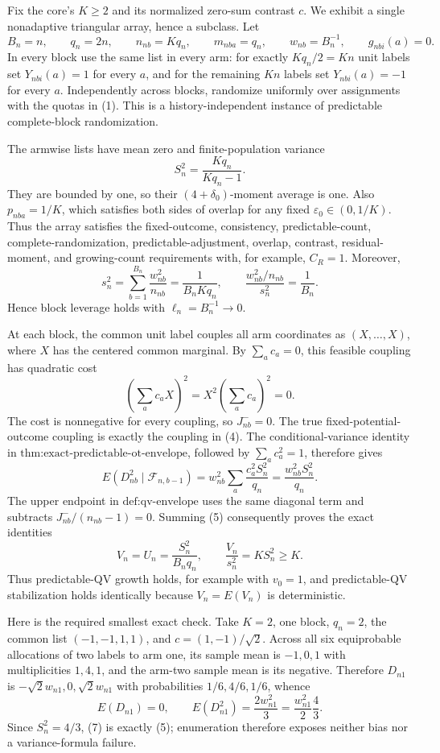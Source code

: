 Fix the core's \(K\ge2\) and its normalized zero-sum contrast \(c\).  We exhibit a single nonadaptive triangular array, hence a subclass.  Let
\[
B_n=n,\qquad q_n=2n,\qquad n_{nb}=Kq_n,\qquad
m_{nba}=q_n,\qquad w_{nb}=B_n^{-1},\qquad g_{nbi}(a)=0.
\tag{1}
\]
In every block use the same list in every arm: for exactly \(Kq_n/2=Kn\) unit labels set \(Y_{nbi}(a)=1\) for every \(a\), and for the remaining \(Kn\) labels set \(Y_{nbi}(a)=-1\) for every \(a\).  Independently across blocks, randomize uniformly over assignments with the quotas in (1).  This is a history-independent instance of predictable complete-block randomization.

The armwise lists have mean zero and finite-population variance
\[
S_n^2=\frac{Kq_n}{Kq_n-1}.
\tag{2}
\]
They are bounded by one, so their \((4+\delta_0)\)-moment average is one.  Also \(p_{nba}=1/K\), which satisfies both sides of overlap for any fixed \(\varepsilon_0\in(0,1/K)\).  Thus the array satisfies the fixed-outcome, consistency, predictable-count, complete-randomization, predictable-adjustment, overlap, contrast, residual-moment, and growing-count requirements with, for example, \(C_R=1\).  Moreover,
\[
s_n^2=\sum_{b=1}^{B_n}\frac{w_{nb}^2}{n_{nb}}
=\frac1{B_nKq_n},
\qquad
\frac{w_{nb}^2/n_{nb}}{s_n^2}=\frac1{B_n}.
\tag{3}
\]
Hence block leverage holds with \(\ell_n=B_n^{-1}\to0\).

At each block, the common unit label couples all arm coordinates as \((X,\ldots,X)\), where \(X\) has the centered common marginal.  By \(\sum_ac_a=0\), this feasible coupling has quadratic cost
\[
\left(\sum_ac_aX\right)^2=X^2\left(\sum_ac_a\right)^2=0.
\tag{4}
\]
The cost is nonnegative for every coupling, so \(J_{nb}^{-}=0\).  The true fixed-potential-outcome coupling is exactly the coupling in (4).  The conditional-variance identity in \(\text{thm:exact-predictable-ot-envelope}\), followed by \(\sum_ac_a^2=1\), therefore gives
\[
E(D_{nb}^2\mid\mathcal F_{n,b-1})
=w_{nb}^2\sum_a\frac{c_a^2S_n^2}{q_n}
=\frac{w_{nb}^2S_n^2}{q_n}.
\tag{5}
\]
The upper endpoint in \(\text{def:qv-envelope}\) uses the same diagonal term and subtracts \(J_{nb}^{-}/(n_{nb}-1)=0\).  Summing (5) consequently proves the exact identities
\[
V_n=U_n=\frac{S_n^2}{B_nq_n},
\qquad
\frac{V_n}{s_n^2}=KS_n^2\ge K.
\tag{6}
\]
Thus predictable-QV growth holds, for example with \(v_0=1\), and predictable-QV stabilization holds identically because \(V_n=E(V_n)\) is deterministic.

Here is the required smallest exact check.  Take \(K=2\), one block, \(q_n=2\), the common list \((-1,-1,1,1)\), and \(c=(1,-1)/\sqrt2\).  Across all six equiprobable allocations of two labels to arm one, its sample mean is \(-1,0,1\) with multiplicities \(1,4,1\), and the arm-two sample mean is its negative.  Therefore \(D_{n1}\) is \(-\sqrt2w_{n1},0,\sqrt2w_{n1}\) with probabilities \(1/6,4/6,1/6\), whence
\[
E(D_{n1})=0,
\qquad
E(D_{n1}^2)=\frac{2w_{n1}^2}{3}
=\frac{w_{n1}^2}{2}\frac43.
\tag{7}
\]
Since \(S_n^2=4/3\), (7) is exactly (5); enumeration therefore exposes neither bias nor a variance-formula failure.


